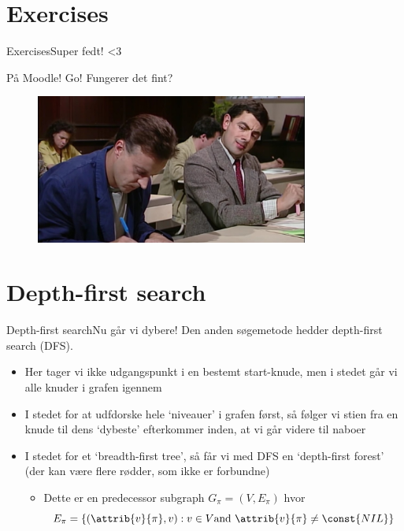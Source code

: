 \documentclass[aspectratio=1610]{beamer}
\begin{document}
\section{Exercises}

\begin{frame}{Exercises}{Super fedt! <3}

    På Moodle! Go! Fungerer det fint?

    \begin{figure}[h]
        \centering
        \includegraphics[width=0.8\textwidth]{../exercises}
    \end{figure}

\end{frame}

\section{Depth-first search}

\begin{frame}{Depth-first search}{Nu går vi dybere!}
    Den anden søgemetode hedder \alert{depth-first search} (DFS).

    \begin{itemize}[<+(1)->]
        \item Her tager vi ikke udgangspunkt i en bestemt start-knude, men i
            stedet går vi alle knuder i grafen igennem
        \item I stedet for at udfdorske hele `niveauer' i grafen først, så
            følger vi stien fra en knude til dens `dybeste' efterkommer inden,
            at vi går videre til naboer
        \item I stedet for et `breadth-first \alert{tree}', så får vi med DFS en
            `depth-first \alert{forest}' (der kan være flere rødder, som ikke er
            forbundne)
            \begin{itemize}
                \item Dette er en \alert{predecessor subgraph} $G_{\pi} =
                    (V,E_{\pi})$ hvor
                     \[
                         E_{\pi} = \{(\attrib{v}{\pi}, v) : v \in V \text{and }
                         \attrib{v}{\pi} \neq \const{NIL} \}
                    \] 
            \end{itemize}
    \end{itemize}
\end{frame}
\end{document}
